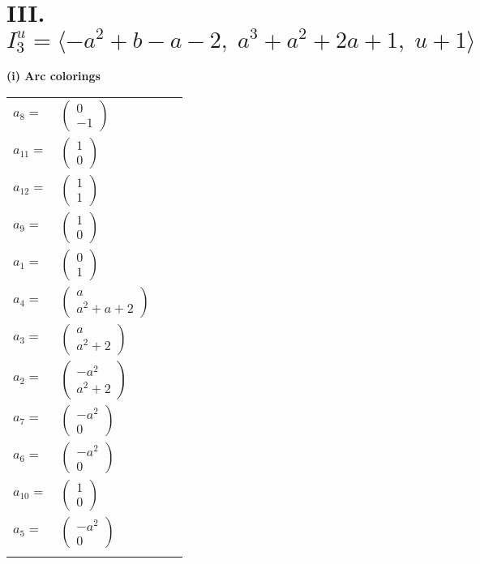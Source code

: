 \documentclass[1p]{elsarticle_modified}
\theoremstyle{definition}
\begin{document}
\centering \section*{III. $I^u_{3}= \langle - a^2+b- a-2,\;a^3+a^2+2 a+1,\;u+1 \rangle$}
\flushleft \textbf{(i) Arc colorings}\\
\begin{tabular}{m{7pt} m{180pt} m{7pt} m{180pt} }
\flushright $a_{8}=$&$\begin{pmatrix}0\\-1\end{pmatrix}$ \\
\flushright $a_{11}=$&$\begin{pmatrix}1\\0\end{pmatrix}$ \\
\flushright $a_{12}=$&$\begin{pmatrix}1\\1\end{pmatrix}$ \\
\flushright $a_{9}=$&$\begin{pmatrix}1\\0\end{pmatrix}$ \\
\flushright $a_{1}=$&$\begin{pmatrix}0\\1\end{pmatrix}$ \\
\flushright $a_{4}=$&$\begin{pmatrix}a\\a^2+a+2\end{pmatrix}$ \\
\flushright $a_{3}=$&$\begin{pmatrix}a\\a^2+2\end{pmatrix}$ \\
\flushright $a_{2}=$&$\begin{pmatrix}- a^2\\a^2+2\end{pmatrix}$ \\
\flushright $a_{7}=$&$\begin{pmatrix}- a^2\\0\end{pmatrix}$ \\
\flushright $a_{6}=$&$\begin{pmatrix}- a^2\\0\end{pmatrix}$ \\
\flushright $a_{10}=$&$\begin{pmatrix}1\\0\end{pmatrix}$ \\
\flushright $a_{5}=$&$\begin{pmatrix}- a^2\\0\end{pmatrix}$\\&\end{tabular}
\end{document}

